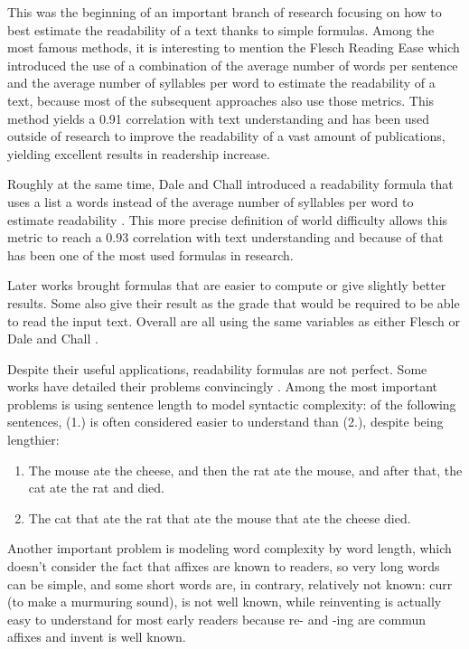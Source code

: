 \documentclass[a4paper, 11pt, onepage]{scrreprt}
\begin{document}
This was the beginning of an important branch of research focusing on
how to best estimate the readability of a text thanks to simple
formulas. Among the most famous methods, it is interesting to mention
the Flesch Reading Ease \cite{flesch1948new} which introduced the use
of a combination of the average number of words per sentence and the
average number of syllables per word to estimate the readability of a
text, because most of the subsequent approaches also use those
metrics. This method yields a 0.91 correlation with text understanding
and has been used outside of research to improve the readability of a
vast amount of publications, yielding excellent results in readership
increase.

Roughly at the same time, Dale and Chall introduced a readability
formula that uses a list a words instead of the average number of
syllables per word to estimate readability
\cite{dale1948formula}. This more precise definition of world
difficulty allows this metric to reach a 0.93 correlation with text
understanding and because of that has been one of the most used
formulas in research.

Later works brought formulas that are easier to compute or give
slightly better results. Some also give their result as the grade that
would be required to be able to read the input text. Overall are all
using the same variables as either Flesch or Dale and Chall
\cite{mclaughlin1969smog, kincaid1975derivation,
  chall1995readability}.

Despite their useful applications, readability formulas are not
perfect. Some works have detailed their problems convincingly
\cite{duffy1985readability, schriver2000readability}. Among the most
important problems is using sentence length to model syntactic
complexity: of the following sentences, (1.) is often considered
easier to understand than (2.), despite being lengthier:
\begin{enumerate}
\item The mouse ate the cheese, and then the rat ate the mouse, and
  after that, the cat ate the rat and died.
\item The cat that ate the rat that ate the mouse that ate the cheese
  died.
\end{enumerate}
Another important problem is modeling word complexity by word length,
which doesn't consider the fact that affixes are known to readers, so
very long words can be simple, and some short words are, in contrary,
relatively not known: curr (to make a murmuring sound), is not well
known, while reinventing is actually easy to understand for most early
readers because re- and -ing are commun affixes and invent is well
known.
\end{document}
